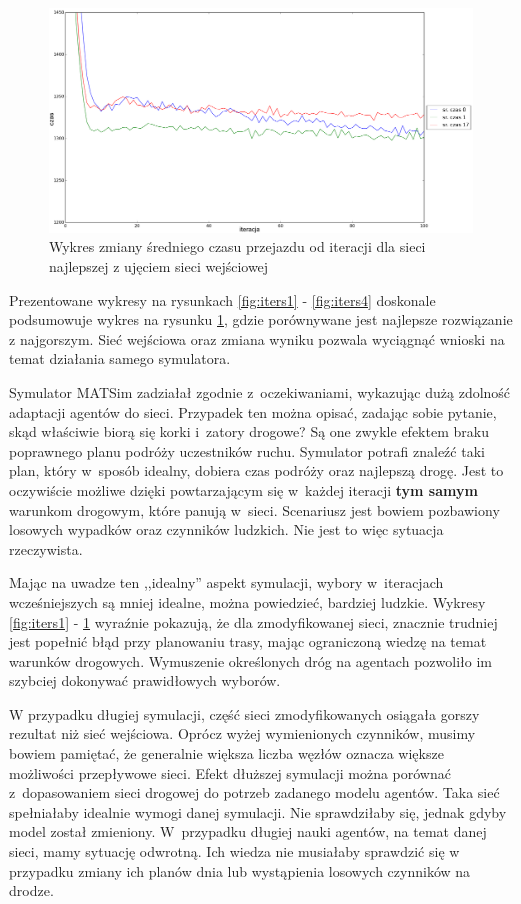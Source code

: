 \documentclass[twoside,12pt]{report}
\begin{document}
\begin{figure}[htbp]
\centering
\includegraphics[width=1\textwidth]{img/iters/iters5}
\caption{Wykres zmiany średniego czasu przejazdu od iteracji dla sieci najlepszej z ujęciem sieci wejściowej}
\label{fig:iters5}
\end{figure}

Prezentowane wykresy na rysunkach \ref{fig:iters1} - \ref{fig:iters4} doskonale podsumowuje wykres na rysunku \ref{fig:iters5}, gdzie porównywane jest najlepsze rozwiązanie z najgorszym. Sieć wejściowa oraz zmiana wyniku pozwala wyciągnąć wnioski na temat działania samego symulatora.

Symulator MATSim zadziałał zgodnie z~oczekiwaniami, wykazując dużą zdolność adaptacji agentów do sieci. Przypadek ten można opisać, zadając sobie pytanie, skąd właściwie biorą się korki i~zatory drogowe? Są one zwykle efektem braku poprawnego planu podróży uczestników ruchu. Symulator potrafi znaleźć taki plan, który w~sposób idealny, dobiera czas podróży oraz najlepszą drogę. Jest to oczywiście możliwe dzięki powtarzającym się w~każdej iteracji \textbf{tym samym} warunkom drogowym, które panują w~sieci. Scenariusz jest bowiem pozbawiony losowych wypadków oraz czynników ludzkich. Nie jest to więc sytuacja rzeczywista.

Mając na uwadze ten ,,idealny'' aspekt symulacji, wybory w~iteracjach wcześniejszych są mniej idealne, można powiedzieć, bardziej ludzkie. Wykresy \ref{fig:iters1} - \ref{fig:iters5} wyraźnie pokazują, że dla zmodyfikowanej sieci, znacznie trudniej jest popełnić błąd przy planowaniu trasy, mając ograniczoną wiedzę na temat warunków drogowych. Wymuszenie określonych dróg na agentach pozwoliło im szybciej dokonywać prawidłowych wyborów.

W przypadku długiej symulacji, część sieci zmodyfikowanych osiągała gorszy rezultat niż sieć wejściowa. Oprócz wyżej wymienionych czynników, musimy bowiem pamiętać, że generalnie większa liczba węzłów oznacza większe możliwości przepływowe sieci. Efekt dłuższej symulacji można porównać z~dopasowaniem sieci drogowej do potrzeb zadanego modelu agentów. Taka sieć spełniałaby idealnie wymogi danej symulacji. Nie sprawdziłaby się, jednak gdyby model został zmieniony. W~przypadku długiej nauki agentów, na temat danej sieci, mamy sytuację odwrotną. Ich wiedza nie musiałaby sprawdzić się w przypadku zmiany ich planów dnia lub wystąpienia losowych czynników na drodze.
\end{document}
